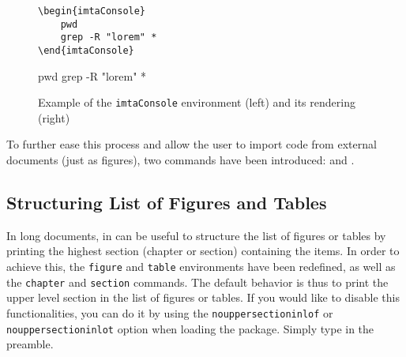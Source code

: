 \documentclass{report}
\begin{document}
\begin{figure}[!ht]
\begin{minipage}{.45\linewidth}
\renewcommand{\theFancyVerbLine}{\texttt{\textcolor{gray!150}{\normalsize \oldstylenums{\arabic{FancyVerbLine}}}}}%
\vspace{0.5\baselineskip}%
\begin{mdframed}[backgroundcolor=imtaCodeLinenosFrame, innerrightmargin=0pt, innertopmargin=0pt, innerbottommargin=0pt, linewidth=1pt]
\begin{mdframed}[backgroundcolor=imtaCodeBackground, skipabove=0pt, skipbelow=0pt, rightmargin=0pt, leftmargin=3ex, linewidth=0pt, innertopmargin=5pt, innerbottommargin=5pt, innerleftmargin=1ex]%
\begin{verbatim}
\begin{imtaConsole}
    pwd
    grep -R "lorem" *
\end{imtaConsole}
\end{verbatim}
\end{mdframed}
\end{mdframed}
\end{minipage}
\hfill
\begin{minipage}{.45\linewidth}
\vspace{2em}
\begin{imtaConsole}
pwd
grep -R "lorem" *
\end{imtaConsole}
\end{minipage}
\caption{Example of the \texttt{imtaConsole} environment (left) and its rendering (right)\label{fig:imtaCode}}
\end{figure}

To further ease this process and allow the user to import code from external documents (just as figures), two commands have been introduced:  and .



\subsection{Structuring List of Figures and Tables}
In long documents, in can be useful to structure the list of figures or tables by printing the highest section (chapter or section) containing the items. 
In order to achieve this, the \texttt{figure} and \texttt{table} environments have been redefined, as well as the \texttt{chapter} and \texttt{section} commands. 
The default behavior is thus to print the upper level section in the list of figures or tables. 
If you would like to disable this functionalities, you can do it by using the \texttt{nouppersectioninlof} or \texttt{nouppersectioninlot} option when loading the package. Simply type  in the preamble.
\end{document}
